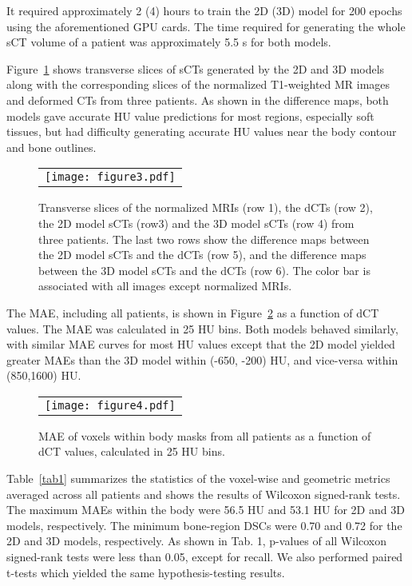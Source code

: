 It required approximately 2 (4) hours to train the 2D (3D) model for 200 epochs using the aforementioned GPU cards. The time required for generating the whole sCT volume of a patient was approximately 5.5 s for both models.  

Figure~\ref{fig3} shows transverse slices of sCTs generated by the 2D and 3D models along with the corresponding slices of the normalized T1-weighted MR images and deformed CTs from three patients. As shown in the difference maps, both models gave accurate HU value predictions for most regions, especially soft tissues, but had difficulty generating accurate HU values near the body contour and bone outlines. 

\begin{figure}
\begin{center}
\begin{tabular}{c}
\texttt{[image: figure3.pdf]}
\end{tabular}
\end{center}
\caption 
{\label{fig3}
Transverse slices of the normalized MRIs (row 1), the dCTs (row 2), the 2D model sCTs (row3) and the 3D model sCTs (row 4) from three patients. The last two rows show the difference maps between the 2D model sCTs and the dCTs (row 5), and the difference maps between the 3D model sCTs and the dCTs (row 6). The color bar is associated with all images except normalized MRIs.} 
\end{figure} 

The MAE, including all patients, is shown in Figure~\ref{fig4} as a function of dCT values. The MAE was calculated in 25 HU bins.  Both models behaved similarly, with similar MAE curves for most HU values except that the 2D model yielded greater MAEs than the 3D model within (-650, -200) HU, and vice-versa within (850,1600) HU. 
\begin{figure}
\begin{center}
\begin{tabular}{c}
\texttt{[image: figure4.pdf]}
\end{tabular}
\end{center}
\caption 
{\label{fig4}
MAE of voxels within body masks from all patients as a function of dCT values, calculated in 25 HU bins.} 
\end{figure}

Table~\ref{tab1} summarizes the statistics of the voxel-wise and geometric metrics averaged across all patients and shows the results of Wilcoxon signed-rank tests. The maximum MAEs within the body were 56.5 HU and 53.1 HU for 2D and 3D models, respectively. The minimum bone-region DSCs were 0.70 and 0.72 for the 2D and 3D models, respectively. As shown in Tab. 1, p-values of all Wilcoxon signed-rank tests were less than 0.05, except for recall. We also performed paired t-tests which yielded the same hypothesis-testing results. 
  

